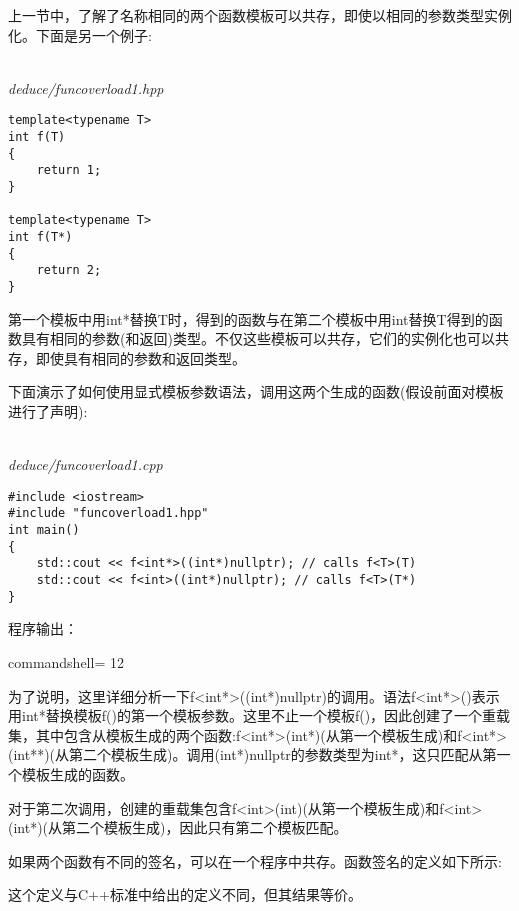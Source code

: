 

上一节中，了解了名称相同的两个函数模板可以共存，即使以相同的参数类型实例化。下面是另一个例子:

\hspace*{\fill} \\ %
\noindent
\textit{deduce/funcoverload1.hpp}
\begin{lstlisting}[style=styleCXX]
template<typename T>
int f(T)
{
	return 1;
}

template<typename T>
int f(T*)
{
	return 2;
}
\end{lstlisting}

第一个模板中用int*替换T时，得到的函数与在第二个模板中用int替换T得到的函数具有相同的参数(和返回)类型。不仅这些模板可以共存，它们的实例化也可以共存，即使具有相同的参数和返回类型。

下面演示了如何使用显式模板参数语法，调用这两个生成的函数(假设前面对模板进行了声明):

\hspace*{\fill} \\ %
\noindent
\textit{deduce/funcoverload1.cpp}
\begin{lstlisting}[style=styleCXX]
#include <iostream>
#include "funcoverload1.hpp"
int main()
{
	std::cout << f<int*>((int*)nullptr); // calls f<T>(T)
	std::cout << f<int>((int*)nullptr); // calls f<T>(T*)
}
\end{lstlisting}

程序输出：

\begin{tcblisting}{commandshell={}}
12
\end{tcblisting}

为了说明，这里详细分析一下f<int*>((int*)nullptr)的调用。语法f<int*>()表示用int*替换模板f()的第一个模板参数。这里不止一个模板f()，因此创建了一个重载集，其中包含从模板生成的两个函数:f<int*>(int*)(从第一个模板生成)和f<int*>(int**)(从第二个模板生成)。调用(int*)nullptr的参数类型为int*，这只匹配从第一个模板生成的函数。

对于第二次调用，创建的重载集包含f<int>(int)(从第一个模板生成)和f<int>(int*)(从第二个模板生成)，因此只有第二个模板匹配。


如果两个函数有不同的签名，可以在一个程序中共存。函数签名的定义如下所示:

\begin{tcolorbox}[colback=webgreen!5!white,colframe=webgreen!75!black]
\hspace*{0.75cm}这个定义与C++标准中给出的定义不同，但其结果等价。
\end{tcolorbox}

